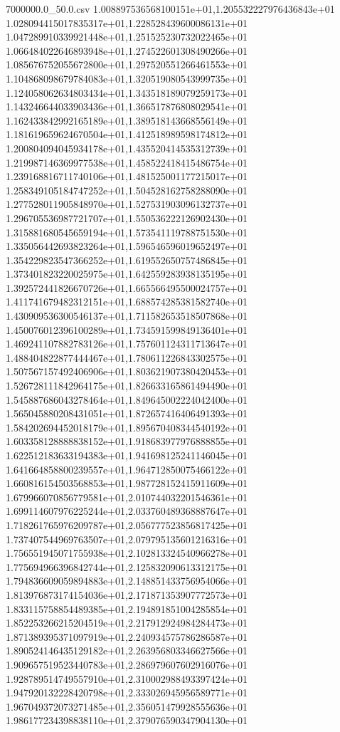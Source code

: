 \begin{filecontents*}{7000000.0_50.0.csv}
1.008897536568100151e+01,1.205532227976436843e+01
1.028094415017835317e+01,1.228528439600086131e+01
1.047289910339921448e+01,1.251525230732022465e+01
1.066484022646893948e+01,1.274522601308490266e+01
1.085676752055672800e+01,1.297520551266461553e+01
1.104868098679784083e+01,1.320519080543999735e+01
1.124058062634803434e+01,1.343518189079259173e+01
1.143246644033903436e+01,1.366517876808029541e+01
1.162433842992165189e+01,1.389518143668556149e+01
1.181619659624670504e+01,1.412518989598174812e+01
1.200804094045934178e+01,1.435520414535312739e+01
1.219987146369977538e+01,1.458522418415486754e+01
1.239168816711740106e+01,1.481525001177215017e+01
1.258349105184747252e+01,1.504528162758288090e+01
1.277528011905848970e+01,1.527531903096132737e+01
1.296705536987721707e+01,1.550536222126902430e+01
1.315881680545659194e+01,1.573541119788751530e+01
1.335056442693823264e+01,1.596546596019652497e+01
1.354229823547366252e+01,1.619552650757486845e+01
1.373401823220025975e+01,1.642559283938135195e+01
1.392572441826670726e+01,1.665566495500024757e+01
1.411741679482312151e+01,1.688574285381582740e+01
1.430909536300546137e+01,1.711582653518507868e+01
1.450076012396100289e+01,1.734591599849136401e+01
1.469241107882783126e+01,1.757601124311713647e+01
1.488404822877444467e+01,1.780611226843302575e+01
1.507567157492406906e+01,1.803621907380420453e+01
1.526728111842964175e+01,1.826633165861494490e+01
1.545887686043278464e+01,1.849645002224042400e+01
1.565045880208431051e+01,1.872657416406491393e+01
1.584202694452018179e+01,1.895670408344540192e+01
1.603358128888838152e+01,1.918683977976888855e+01
1.622512183633194383e+01,1.941698125241146045e+01
1.641664858800239557e+01,1.964712850075466122e+01
1.660816154503568853e+01,1.987728152415911609e+01
1.679966070856779581e+01,2.010744032201546361e+01
1.699114607976225244e+01,2.033760489368887647e+01
1.718261765976209787e+01,2.056777523856817425e+01
1.737407544969763507e+01,2.079795135601216316e+01
1.756551945071755938e+01,2.102813324540966278e+01
1.775694966396842744e+01,2.125832090613312175e+01
1.794836609059894883e+01,2.148851433756954066e+01
1.813976873174154036e+01,2.171871353907772573e+01
1.833115758854489385e+01,2.194891851004285854e+01
1.852253266215204519e+01,2.217912924984284473e+01
1.871389395371097919e+01,2.240934575786286587e+01
1.890524146435129182e+01,2.263956803346627566e+01
1.909657519523440783e+01,2.286979607602916076e+01
1.928789514749557910e+01,2.310002988493397424e+01
1.947920132228420798e+01,2.333026945956589771e+01
1.967049372073271485e+01,2.356051479928555636e+01
1.986177234398838110e+01,2.379076590347904130e+01

\end{filecontents*}
